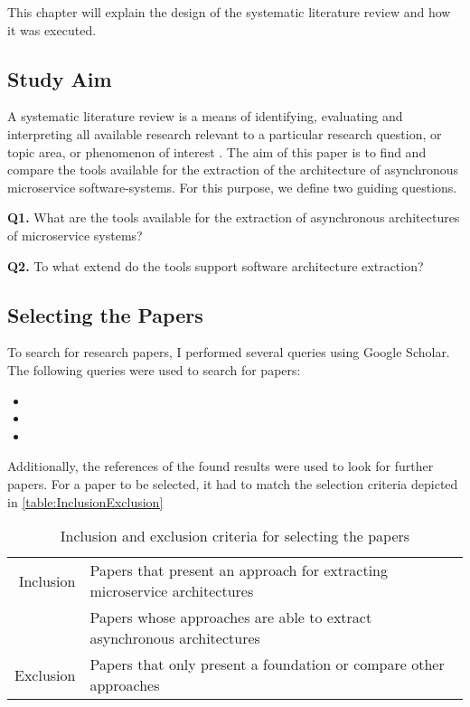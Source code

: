 This chapter will explain the design of the systematic literature review and how it was executed.

\subsection{Study Aim}
\label{sec:StudyDesign:StudyAim}
A systematic literature review is a means of identifying, evaluating and interpreting all available research relevant to a particular research question, or topic area, or phenomenon of interest \cite{Keele2007guidelines}.
The aim of this paper is to find and compare the tools available for the extraction of the architecture of asynchronous microservice software-systems.
For this purpose, we define two guiding questions.

\textbf{Q1.} What are the tools available for the extraction of asynchronous architectures of microservice systems?

\textbf{Q2.} To what extend do the tools support software architecture extraction?

\subsection{Selecting the Papers}
\label{sec:StudyDesign:SelectingPapers}
To search for research papers, I  performed several queries using Google Scholar.
The following queries were used to search for papers:
\begin{itemize}
	\item {}
	\item {}
	\item {}
\end{itemize}

Additionally, the references of the found results were used to look for further papers.
For a paper to be selected, it had to match the selection criteria depicted in \autoref{table:InclusionExclusion}


\begin{table}
\centering
\begin{tabular}{r l}
\toprule
Inclusion
& Papers that present an approach for extracting microservice architectures \\
& Papers whose approaches are able to extract asynchronous architectures \\
\midrule
Exclusion
& Papers that only present a foundation or compare other approaches \\
\bottomrule
\end{tabular}
\caption{Inclusion and exclusion criteria for selecting the papers}
\label{table:InclusionExclusion}
\end{table}


